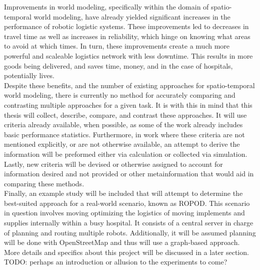   Improvements in world modeling, specifically within the domain of
  spatio-temporal world modeling, have already yielded significant increases
  in the performance of robotic logistic systems. These improvements led to
  decreases in travel time as well as increases in reliability, which hinge
  on knowing what areas to avoid at which times. In turn, these improvements
  create a much more powerful and scaleable logistics network with less
  downtime. This results in more goods being delivered, and saves
  time, money, and in the case of hospitals, potentially lives. \\

  Despite these benefits, and the number of existing approaches
  for spatio-temporal world modeling, there is currently no method for
  accurately comparing and contrasting multiple approaches for a given task. It is with this
  in mind that this thesis will collect, describe, compare, and contrast these
  approaches. It will use criteria already available, when possible, as some
  of the work already includes basic performance statistics.
  Furthermore, in work where these criteria are not mentioned explicitly, or are
  not otherwise available, an attempt to derive the information will be preformed either via
  calculation or collected via simulation. Lastly, new criteria will be devised
  or otherwise assigned to account for information desired and not provided
  or other metainformation that would aid in comparing these methods. \\

  Finally, an example study will be included that will attempt to determine the
  best-suited approach for a real-world scenario, known as ROPOD. This
  scenario in question involves moving optimizing the logistics of moving
  implements and supplies internally within a busy hospital.
  It consists of a central server in charge of planning and routing multiple
  robots. Additionally, it will be assumed planning will be done with
  OpenStreetMap and thus will use a graph-based approach. More details and
  specifics about this project will be discussed in a later section. \\


  TODO: perhaps an introduction or allusion to the experiments to come?


